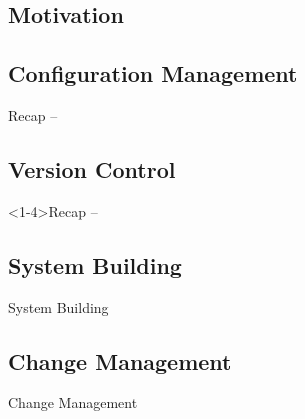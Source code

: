 
\subsection{Motivation}


\begin{frame}{\insertsubsection}
\end{frame}



\subsection{Configuration Management}
\begin{frame}{Recap -- \insertsubsection \mytitlesource{\sommerville}}
	\slideConfigManagement
\end{frame}

\subsection{Version Control}
\begin{frame}<1-4>{Recap -- \insertsubsection  \mytitlesource{\sommerville}}
	\slideVersionControl
\end{frame}

\subsection{System Building}
\begin{frame}{\insertsubsection  \mytitlesource{\sommerville}}
	\begin{fancycolumns}[animation=none]
		\begin{definition}{System Building}
			
		\end{definition}\pause
		\nextcolumn
		
	\end{fancycolumns}
\end{frame}

\subsection{Change Management}
\begin{frame}{\insertsubsection  \mytitlesource{\sommerville}}
	\begin{fancycolumns}[animation=none]
		\begin{definition}{Change Management}
			
		\end{definition}\pause
		\nextcolumn
	\end{fancycolumns}
\end{frame}


